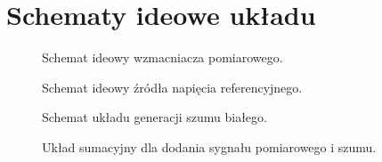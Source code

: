 \section{Schematy ideowe układu}
    \begin{figure}[!ht]
        \centering
        \scalebox{1}{}
        \caption{Schemat ideowy wzmacniacza pomiarowego.}
        \label{sch:INA333}
    \end{figure}
    \begin{figure}[!ht]
        \centering
        \scalebox{1}{}
        \caption{Schemat ideowy źródła napięcia referencyjnego.}
        \label{sch:Vref_gen}
    \end{figure}
    \begin{figure}[!ht]
        \centering
        \scalebox{1}{}
        \caption{Schemat układu generacji szumu białego.}
        \label{sch:Noise_gen}
    \end{figure}
    \begin{figure}[!ht]
        \centering
        \scalebox{1}{}
        \caption{Układ sumacyjny dla dodania sygnału pomiarowego i szumu.}
        \label{sch:sumator}
    \end{figure}